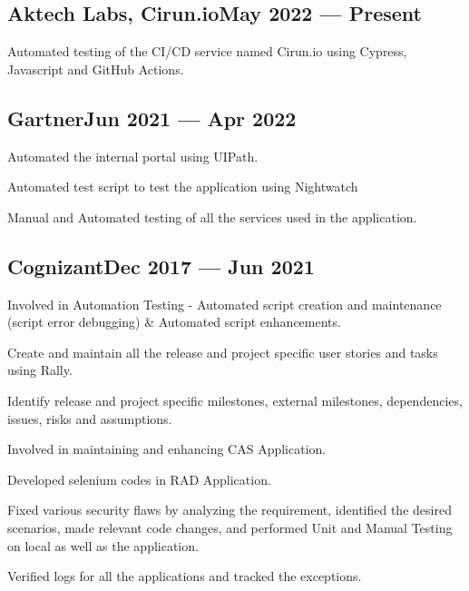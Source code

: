 \subsection{{Aktech Labs, Cirun.io\hfill May 2022 --- Present}}
\begin{zitemize}
\item Automated testing of the CI/CD service named Cirun.io
using Cypress, Javascript and GitHub Actions.
\end{zitemize}


\subsection{{Gartner\hfill Jun 2021 --- Apr 2022}}
\begin{zitemize}
\item Automated the internal portal using UIPath.
\item Automated test script to test the application using Nightwatch
\item Manual and Automated testing of all the services used in the application.
\end{zitemize}

\subsection{{Cognizant\hfill Dec 2017 --- Jun 2021}}
\begin{zitemize}
\item Involved in Automation Testing - Automated script creation and maintenance (script error
debugging) \& Automated script enhancements.
\item Create and maintain all the release and project specific user stories and tasks using Rally.
\item Identify release and project specific milestones, external milestones,
dependencies, issues, risks and assumptions.
\end{zitemize}


\begin{zitemize}
\item Involved in maintaining and enhancing CAS Application.
\item Developed selenium codes in RAD Application.
\item Fixed various security flaws by analyzing the requirement, identified the desired scenarios,
made relevant code changes, and performed Unit and Manual Testing on local as well as
the application.
\item Verified logs for all the applications and tracked the exceptions.
\end{zitemize}

